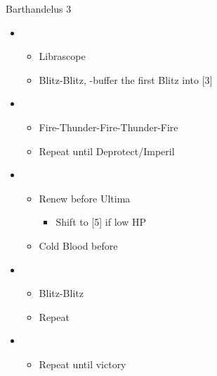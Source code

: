 \begin{battle}{Barthandelus 3}
	\begin{itemize}
		\item \fourth
			\begin{itemize}
				\item Librascope
				\item Blitz-Blitz, \rav-buffer the first Blitz into [3]
			\end{itemize}
		\item \third
			\begin{itemize}
				\item Fire-Thunder-Fire-Thunder-Fire
				\item Repeat until Deprotect/Imperil
			\end{itemize}
		\item \first
			\begin{itemize}
				\item Renew before Ultima
					\begin{itemize}
						\item Shift to [5] if low HP
					\end{itemize}
				\item Cold Blood before \stagger
			\end{itemize}
		\item \fourth
			\begin{itemize}
				\item Blitz-Blitz
				\item Repeat
			\end{itemize}
		\item \second
			\begin{itemize}
				\item Repeat until victory
			\end{itemize}
	\end{itemize}
\end{battle}
\vfill

